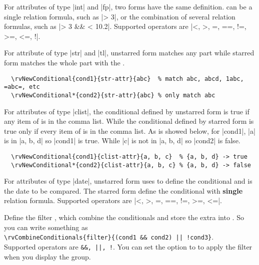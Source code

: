 \documentclass[full]{l3doc}
\begin{document}
\begin{documentation}
For attributes of type |int| and |fp|, two forms have the same definition.
 can be a single relation formula, such as |\rval > 3|, or the
combination of several relation formulas, such as |\rval > 3 && \rval < 10.2|.
Supported operators are |<, >, =, ==, !=, >=, <=, !|.

For attribute of type |str| and |tl|, unstarred form matches any part while
starred form matches the whole part with the .
\begin{verbatim}
  \rvNewConditional{cond1}{str-attr}{abc}  % match abc, abcd, 1abc, =abc=, etc
  \rvNewConditional*{cond2}{str-attr}{abc} % only match abc
\end{verbatim}

For attributes of type |clist|, the conditional defined by unstarred form is
true if any item of  is in the comma list. While the
conditional defined by starred form is true only if every item of  is in the comma list. As is showed below, for |cond1|, |a| is in
|{a, b, d}| so |cond1| is true. While |c| is not in |{a, b, d}| so |cond2| is
false.

\begin{verbatim}
  \rvNewConditional{cond1}{clist-attr}{a, b, c}  % {a, b, d} -> true
  \rvNewConditional*{cond2}{clist-attr}{a, b, c} % {a, b, d} -> false
\end{verbatim}

For attributes of type |date|, unstarred form uses  to
define the conditional and  is the date to be compared. The starred
form define the conditional with \textbf{single} relation formula. Supported
operators are |<, >, =, ==, !=, >=, <=|.

\begin{function}{\rvCombineConditionals}
  \begin{syntax}
       
  \end{syntax}

  Define the filter , which combine the conditionals and store the
  extra  into . So you can write something as\\
  \verb=\rvCombineConditionals{filter}{(cond1 && cond2) || !cond3}=.\\
  Supported operators are \verb=&&, ||, !=. You can set the option 
  to  to apply the filter when you display the group.
\end{function}


\end{documentation}
\end{document}
